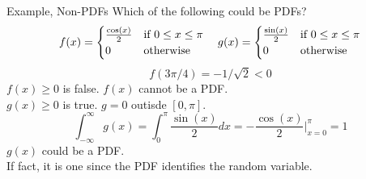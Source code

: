\documentclass[handout]{beamer}
\newcommand{\nl}[1]{\vspace{#1 em}}
\begin{document}
    \begin{frame}{Example, Non-PDFs}
        Which of the following could be PDFs?
        $$f(x)=\begin{cases} \frac{\cos(x)}{2} & \text{if }0\leq x\leq \pi \\
        0 & \text{otherwise}\end{cases} \hskip 1em g(x)=\begin{cases} \frac{\sin(x)}{2} & \text{if }0\leq x\leq \pi \\
        0 & \text{otherwise}\end{cases}$$
        \pause
        $$ f(3\pi /4) = -1/\sqrt{2} < 0 $$
        $f(x)\geq 0$ is false. $f(x)$ cannot be a PDF.\\ \nl{0.5}
        \pause 
        $g(x) \geq 0$ is true. $g=0$ outisde $[0,\pi]$.
        \pause
        $$\int_{-\infty}^\infty g(x) = \int_{0}^{\pi} \frac{\sin{(x)}}{2} dx = -\frac{\cos{(x)}}{2} \bigg|_{x=0}^\pi = 1$$
        $g(x)$ could be a PDF.\\ \nl{0.5}
        \pause If fact, it is one since the PDF identifies the random variable.
    \end{frame}
\end{document}

